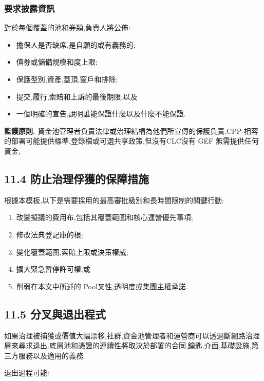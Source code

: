 \documentclass[11pt]{article}
\begin{document}
\subsubsection*{要求披露資訊}

對於每個覆蓋的池和券類,負責人將公佈:

\begin{itemize}[leftmargin=*]
\item 擔保人是否缺席,是自願的或有義務的;
\item 債券或儲備規模和度上限;
\item 保護型別,資產,蓋頂,窗戶和排除;
\item 提交,履行,索賠和上訴的最後期限;以及
\item 一個明確的宣告,說明誰能保證什麼以及什麼不能保證.
\end{itemize}
\textbf{監護原則.} 資金池管理者負責法律或治理結構為他們所宣傳的保護負責.CPP-相容的部署可能提供標準,登錄檔或可選共享政策,但沒有CLC沒有 GEF 無需提供任何資金,

\subsection*{11.4 防止治理俘獲的保障措施}

根據本模板,以下是需要採用的最高審批級別和長時間限制的關鍵行動:

\begin{enumerate}[leftmargin=*]
\item 改變擬議的費用布,包括其覆蓋範圍和核心運營優先事項;
\item 修改法典登記庫的根;
\item 變化覆蓋範圍,索賠上限或決策權威;
\item 擴大緊急暫停許可權;或
\item 削弱在本文中所述的 Pool叉性,透明度或集團主權承諾.
\end{enumerate}
\subsection*{11.5 分叉與退出程式}

如果治理被捕獲或價值大幅漂移,社群,資金池管理者和運營商可以透過斷網路治理層來尋求退出.底層池和憑證的連續性將取決於部署的合同,鑰匙,介面,基礎設施,第三方服務以及適用的義務.

退出過程可能:
\end{document}
